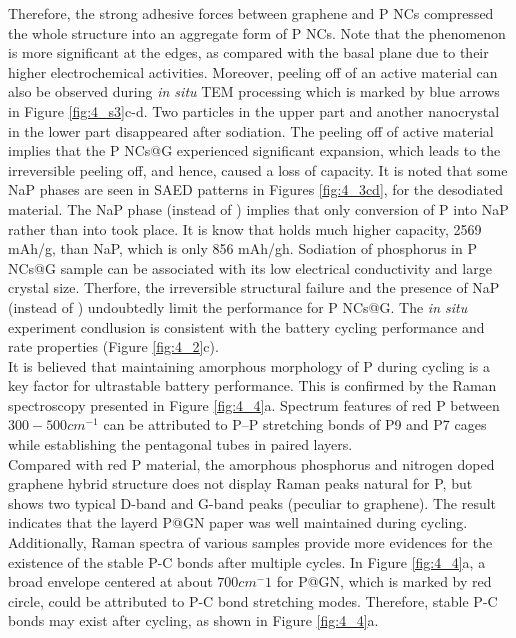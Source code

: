 Therefore, the strong adhesive forces between graphene and P NCs compressed the whole structure into an aggregate form of P NCs. 
Note that the phenomenon is more significant at the edges, as compared with the basal plane due to their higher electrochemical activities. 
Moreover, peeling off of an active material can also be observed during {\em in situ} TEM processing which is marked by blue arrows in Figure \ref{fig:4_s3}c-d. Two particles in the upper part and another nanocrystal in the lower part disappeared after sodiation. 
The peeling off of active material implies that the P NCs@G experienced significant expansion, which leads to the irreversible peeling off, and hence, caused a loss of capacity. 
It is noted that some NaP phases are seen in SAED patterns in Figures \ref{fig:4_3cd}, for the desodiated material. The NaP phase (instead of ) implies that only conversion of P into NaP rather than into  took place. It is know that  holds much higher capacity, 2569 mAh/g, than NaP, which is only 856 mAh/gh. 
Sodiation of phosphorus in P NCs@G sample can be associated with its low electrical conductivity and large crystal size. 
Therfore, the irreversible structural failure and the presence of NaP (instead of ) undoubtedly limit the performance for P NCs@G. 
The {\it in situ} experiment condlusion is consistent with the battery cycling performance and rate properties (Figure \ref{fig:4_2}c). \\
It is believed that maintaining amorphous morphology of P during cycling is a key factor for ultrastable battery performance. 
This is confirmed by the Raman spectroscopy presented in Figure \ref{fig:4_4}a. 
Spectrum features of red P between $300-500 cm^{-1}$ can be attributed to P–P stretching bonds of P9 and P7 cages while establishing the pentagonal tubes in paired layers.\\

Compared with red P material, the amorphous phosphorus and nitrogen doped graphene hybrid structure does not display Raman peaks natural for P, but shows two typical D-band and G-band peaks (peculiar to graphene).\cite{Kim2013c} 
The result indicates that the layerd P@GN paper was well maintained during cycling. 
Additionally, Raman spectra of various samples provide more evidences for the existence of the stable P-C bonds after multiple cycles. 
In Figure \ref{fig:4_4}a, a broad envelope centered at about $700 cm^-1$ for P@GN, which is marked by red circle, could be attributed to P-C bond stretching modes. 
Therefore, stable P-C bonds may exist after cycling, as shown in Figure \ref{fig:4_4}a. \\

